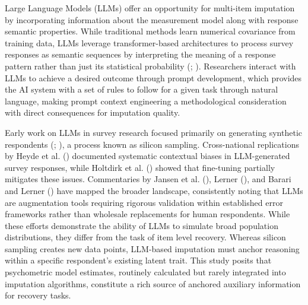 \documentclass[
  man,
  floatsintext,
  longtable,
  nolmodern,
  notxfonts,
  notimes,
  colorlinks=true,linkcolor=blue,citecolor=blue,urlcolor=blue]{apa7}
\begin{document}
Large Language Models (LLMs) offer an opportunity for multi-item
imputation by incorporating information about the measurement model
along with response semantic properties. While traditional methods learn
numerical covariance from training data, LLMs leverage transformer-based
architectures to process survey responses as semantic sequences by
interpreting the meaning of a response pattern rather than just its
statistical probability (;
). Researchers interact
with LLMs to achieve a desired outcome through prompt development, which
provides the AI system with a set of rules to follow for a given task
through natural language, making prompt context engineering a
methodological consideration with direct consequences for imputation
quality.

Early work on LLMs in survey research focused primarily on generating
synthetic respondents (;
), a process known as
silicon sampling. Cross-national replications by Heyde et al.
() documented systematic contextual
biases in LLM-generated survey responses, while Holtdirk et al.
() showed that fine-tuning partially
mitigates these issues. Commentaries by Jansen et al.
(), Lerner
(), and Barari and Lerner
() have mapped the broader landscape,
consistently noting that LLMs are augmentation tools requiring rigorous
validation within established error frameworks rather than wholesale
replacements for human respondents. While these efforts demonstrate the
ability of LLMs to simulate broad population distributions, they differ
from the task of item level recovery. Whereas silicon sampling creates
new data points, LLM-based imputation must anchor reasoning within a
specific respondent's existing latent trait. This study posits that
psychometric model estimates, routinely calculated but rarely integrated
into imputation algorithms, constitute a rich source of anchored
auxiliary information for recovery tasks.
\end{document}
